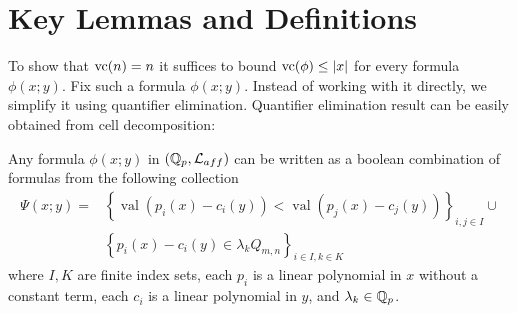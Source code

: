 \documentclass{amsart}
\renewcommand{\LL}{\mathcal L}
\newcommand{\curly}[1]{\left\{#1\right\}}
\DeclareMathOperator{\val}{val}
\DeclareMathOperator{\vval}{val}
\begin{document}




\section{Key Lemmas and Definitions}

To show that $\operatorname{vc}(n) = n$ it suffices to bound $\operatorname{vc}(\phi) \leq |x|$ for every formula $\phi(x; y)$.
Fix such a formula $\phi(x; y)$.
Instead of working with it directly, we simplify it using quantifier elimination.
Quantifier elimination result can be easily obtained from cell decomposition:
\begin{Lemma} \label{quantifier_elimination}
  Any formula $\phi(x; y)$ in $(\Q_p, \LL_{aff})$ can be written as a boolean combination of formulas from the following collection
  \begin{align*}
    \Psi(x; y) = &\curly{\vval (p_i(x) - c_i(y)) < \vval (p_j(x) - c_j(y))}_{i, j \in I} \cup \\
    &\curly{p_i(x) - c_i(y) \in \lambda_k Q_{m,n}}_{i \in I , k \in K}
  \end{align*}
  where $I, K$ are finite index sets,
  each $p_i$ is a linear polynomial in $x$ without a constant term,
  each $c_i$ is a linear polynomial in $y$, and
  $\lambda_k \in \mathbb{Q}_p$.
\end{Lemma}
\end{document}
